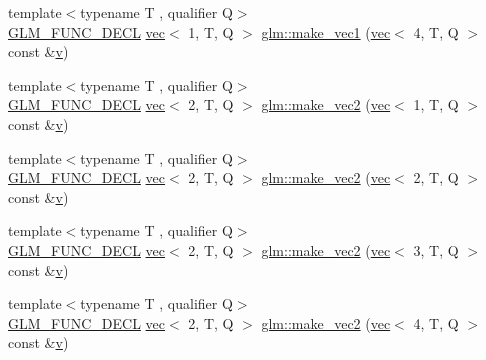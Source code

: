 \begin{DoxyCompactItemize}
\item 
{\footnotesize template$<$typename T , qualifier Q$>$ }\\\hyperlink{setup_8hpp_ab2d052de21a70539923e9bcbf6e83a51}{G\+L\+M\+\_\+\+F\+U\+N\+C\+\_\+\+D\+E\+CL} \hyperlink{structglm_1_1vec}{vec}$<$ 1, T, Q $>$ \hyperlink{group__gtc__type__ptr_ga6af06bb60d64ca8bcd169e3c93bc2419}{glm\+::make\+\_\+vec1} (\hyperlink{structglm_1_1vec}{vec}$<$ 4, T, Q $>$ const \&\hyperlink{_s_d_l__opengl_8h_a10a82eabcb59d2fcd74acee063775f90}{v})
\item 
{\footnotesize template$<$typename T , qualifier Q$>$ }\\\hyperlink{setup_8hpp_ab2d052de21a70539923e9bcbf6e83a51}{G\+L\+M\+\_\+\+F\+U\+N\+C\+\_\+\+D\+E\+CL} \hyperlink{structglm_1_1vec}{vec}$<$ 2, T, Q $>$ \hyperlink{group__gtc__type__ptr_ga8476d0e6f1b9b4a6193cc25f59d8a896}{glm\+::make\+\_\+vec2} (\hyperlink{structglm_1_1vec}{vec}$<$ 1, T, Q $>$ const \&\hyperlink{_s_d_l__opengl_8h_a10a82eabcb59d2fcd74acee063775f90}{v})
\item 
{\footnotesize template$<$typename T , qualifier Q$>$ }\\\hyperlink{setup_8hpp_ab2d052de21a70539923e9bcbf6e83a51}{G\+L\+M\+\_\+\+F\+U\+N\+C\+\_\+\+D\+E\+CL} \hyperlink{structglm_1_1vec}{vec}$<$ 2, T, Q $>$ \hyperlink{group__gtc__type__ptr_gae54bd325a08ad26edf63929201adebc7}{glm\+::make\+\_\+vec2} (\hyperlink{structglm_1_1vec}{vec}$<$ 2, T, Q $>$ const \&\hyperlink{_s_d_l__opengl_8h_a10a82eabcb59d2fcd74acee063775f90}{v})
\item 
{\footnotesize template$<$typename T , qualifier Q$>$ }\\\hyperlink{setup_8hpp_ab2d052de21a70539923e9bcbf6e83a51}{G\+L\+M\+\_\+\+F\+U\+N\+C\+\_\+\+D\+E\+CL} \hyperlink{structglm_1_1vec}{vec}$<$ 2, T, Q $>$ \hyperlink{group__gtc__type__ptr_ga0084fea4694cf47276e9cccbe7b1015a}{glm\+::make\+\_\+vec2} (\hyperlink{structglm_1_1vec}{vec}$<$ 3, T, Q $>$ const \&\hyperlink{_s_d_l__opengl_8h_a10a82eabcb59d2fcd74acee063775f90}{v})
\item 
{\footnotesize template$<$typename T , qualifier Q$>$ }\\\hyperlink{setup_8hpp_ab2d052de21a70539923e9bcbf6e83a51}{G\+L\+M\+\_\+\+F\+U\+N\+C\+\_\+\+D\+E\+CL} \hyperlink{structglm_1_1vec}{vec}$<$ 2, T, Q $>$ \hyperlink{group__gtc__type__ptr_ga2b81f71f3a222fe5bba81e3983751249}{glm\+::make\+\_\+vec2} (\hyperlink{structglm_1_1vec}{vec}$<$ 4, T, Q $>$ const \&\hyperlink{_s_d_l__opengl_8h_a10a82eabcb59d2fcd74acee063775f90}{v})
\item 

\end{DoxyCompactItemize}
